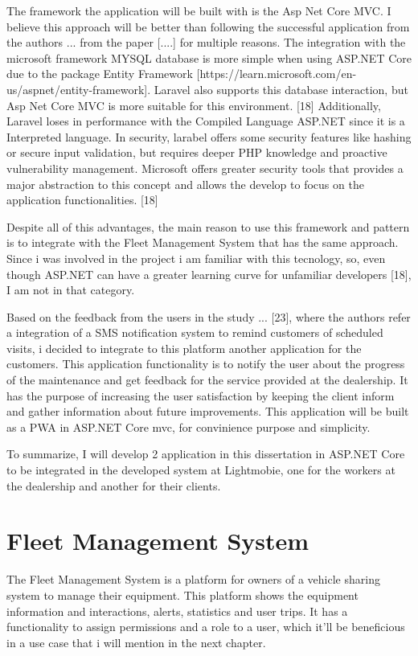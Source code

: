 The framework the application will be built with is the Asp Net Core MVC. 
I believe this approach will be better than following the successful application from the authors ... from the paper [....] for multiple reasons.
The integration with the microsoft framework MYSQL database is more simple when using ASP.NET Core due to the package Entity Framework [https://learn.microsoft.com/en-us/aspnet/entity-framework]. 
Laravel also supports this database interaction, but Asp Net Core MVC is more suitable for this environment. [18]
Additionally, Laravel loses in performance with the Compiled Language ASP.NET since it is a Interpreted language. 
In security, larabel offers some security features like hashing or secure input validation, but requires deeper PHP knowledge and proactive vulnerability management. 
Microsoft offers greater security tools that provides a major abstraction to this concept and allows the develop to focus on the application functionalities. [18]

Despite all of this advantages, the main reason to use this framework and pattern is to integrate with the Fleet Management System that has the same approach. 
Since i was involved in the project i am familiar with this tecnology, so, even though ASP.NET can have a greater learning curve for unfamiliar developers [18], I am not in that category.

Based on the feedback from the users in the study ... [23], where the authors refer a integration of a SMS notification system to remind customers of scheduled visits, i decided to integrate to this platform another application for the customers. 
This application functionality is to notify the user about the progress of the maintenance and get feedback for the service provided at the dealership.
It has the purpose of increasing the user satisfaction by keeping the client inform and gather information about future improvements.
This application will be built as a \ac{PWA} in ASP.NET Core mvc, for convinience purpose and simplicity.

To summarize, I will develop 2 application in this dissertation in ASP.NET Core to be integrated in the developed system at Lightmobie, one for the workers at the dealership and another for their clients.


\section{Fleet Management System}
The Fleet Management System is a platform for owners of a vehicle sharing system to manage their equipment. 
This platform shows the equipment information and interactions, alerts, statistics and user trips. 
It has a functionality to assign permissions and a role to a user, which it'll be beneficious in a use case that i will mention in the next chapter.   

